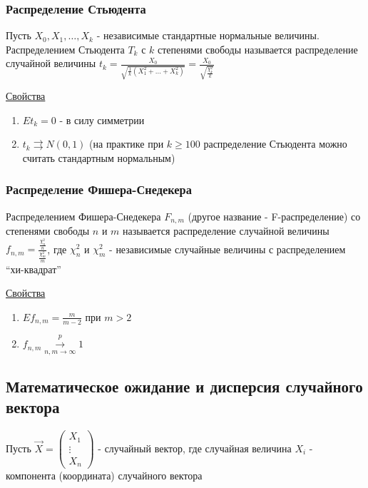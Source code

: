 \documentclass[12pt]{article}
\begin{document}
\subsubsection{Распределение Стьюдента}

\Def Пусть $X_0, X_1, \dots, X_k$ - независимые стандартные нормальные величины. 
Распределением Стьюдента $T_k$ с $k$ степенями свободы называется распределение случайной величины 
$t_k = \frac{X_0}{\sqrt{\frac{1}{k} (X_1^2 + \dots + X_k^2)}} = \frac{X_0}{\sqrt{\frac{\chi_k^2}{k}}}$

\underline{Свойства}

\begin{enumerate}
    \item $Et_k = 0$ - в силу симметрии

    \item $t_k \rightrightarrows N(0, 1)$ (на практике при $k \geq 100$ распределение Стьюдента можно считать стандартным нормальным)
\end{enumerate}

\subsubsection{Распределение Фишера-Снедекера}

\Def Распределением Фишера-Снедекера $F_{n,m}$ (другое название - F-распределение) со степенями свободы $n$ и $m$ называется распределение случайной величины 
$f_{n,m} = \frac{\frac{\chi^2_n}{n}}{\frac{\chi^2_m}{m}}$, где $\chi_n^2$ и $\chi_m^2$ - независимые случайные величины с распределением \enquote{хи-квадрат}

\underline{Свойства}

\begin{enumerate}
    \item $E f_{n,m} = \frac{m}{m - 2}$ при $m > 2$

    \item $f_{n,m} \overset{p}{\underset{n, m \to \infty}{\longrightarrow}} 1$
\end{enumerate}


\subsection{Математическое ожидание и дисперсия случайного вектора}

Пусть $\vec X = \begin{pmatrix}X_1 \\ \vdots \\ X_n\end{pmatrix}$ - случайный вектор, 
где случайная величина $X_i$ - компонента (координата) случайного вектора
\end{document}
